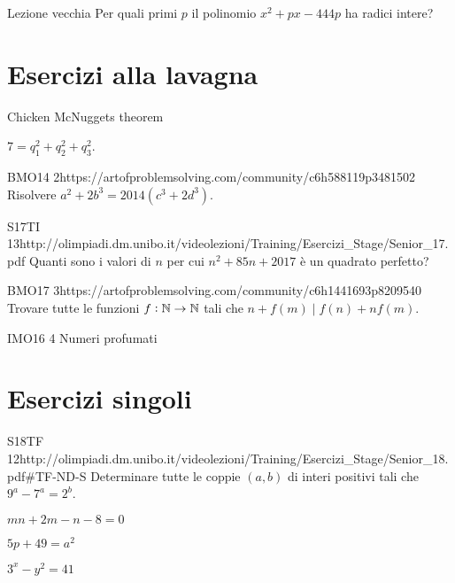 \documentclass[12pt]{article}
\begin{document}
\begin{esercizio}{Lezione vecchia}{}
    Per quali primi $p$ il polinomio $x^2+px-444p$ ha radici intere?
\end{esercizio}

\section{Esercizi alla lavagna}

Chicken McNuggets theorem

$7=q_1^2+q_2^2+q_3^2$.

\begin{esercizio}{BMO14 2}{https://artofproblemsolving.com/community/c6h588119p3481502}
    Risolvere $a^2+2b^3=2014(c^3+2d^3)$.
\end{esercizio}

\begin{esercizio}{S17TI 13}{http://olimpiadi.dm.unibo.it/videolezioni/Training/Esercizi_Stage/Senior_17.pdf}
    Quanti sono i valori di $n$ per cui $n^2+85n+2017$ è un quadrato perfetto?
\end{esercizio}

\begin{esercizio}{BMO17 3}{https://artofproblemsolving.com/community/c6h1441693p8209540}
    Trovare tutte le funzioni $f:\mathbb{N}\to\mathbb{N}$ tali che $n+f(m)\mid f(n)+nf(m)$.
\end{esercizio}

\begin{esercizio}{IMO16 4}{}
    Numeri profumati
\end{esercizio}



\section{Esercizi singoli}

\begin{esercizio}{S18TF 12}{http://olimpiadi.dm.unibo.it/videolezioni/Training/Esercizi_Stage/Senior_18.pdf\#TF-ND-S}
    Determinare tutte le coppie $(a,b)$ di interi positivi tali che $9^a-7^a=2^b$.
\end{esercizio}

\begin{esercizio}{}{}
    $mn+2m-n-8=0$
\end{esercizio}

\begin{esercizio}{}{}
    $5p+49=a^2$
\end{esercizio}

\begin{esercizio}{}{}
    $3^x-y^2=41$
\end{esercizio}
\end{document}
